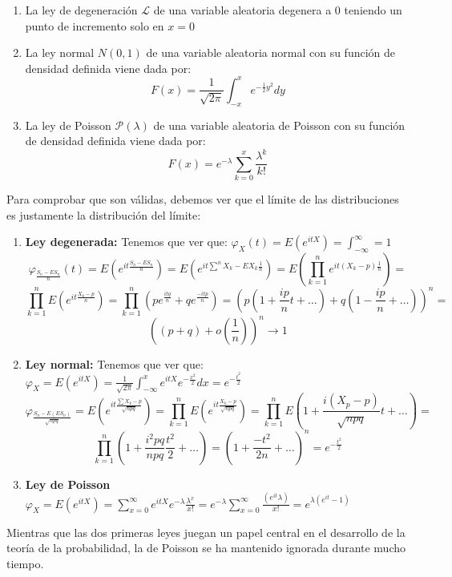 \begin{enumerate}
\item La ley de degeneración $\mathcal{L}$ de una variable aleatoria degenera a 0 teniendo un punto de incremento solo en $x=0$
\item La ley normal $N(0,1)$ de una variable aleatoria normal con su función de densidad definida viene dada por:
$$F(x)=\frac{1}{\sqrt{2\pi}}\int_{-x}^{x}e^{-\frac{1}{2}y^2}dy$$
\item La ley de Poisson $\mathcal{P}(\lambda)$ de una variable aleatoria de Poisson con su función de densidad definida viene dada por:
$$F(x)=e^{-\lambda}\sum_{k=0}^x \frac{\lambda^k}{k!}$$
\end{enumerate}
Para comprobar que son válidas, debemos ver que el límite de las distribuciones es justamente la distribución del límite:
\begin{enumerate}
\item \textbf{Ley degenerada: }Tenemos que ver que: $\varphi_{X}(t)=E(e^{itX})=\int_{-\infty}^{\infty}=1$
$$\varphi_{\frac{S_n -ES_n}{n}}(t)=E(e^{it\frac{S_n-ES_n}{n}})=E(e^{it\sum^n X_k-EX_k\frac{1}{n}})=E(\prod_{k=1}^{n}e^{it(X_k-p)\frac{1}{n}})=$$
$$\prod_{k=1}^{n}E(e^{it\frac{X_k-p}{n}})=\prod_{k=1}^{n}(pe^{\frac{itq}{n}}+qe^{\frac{-itp}{n}})=(p(1+\frac{ip}{n}t+\ldots)+q(1-\frac{ip}{n}+\ldots))^n=$$
$$((p+q)+o(\frac{1}{n}))^n\rightarrow 1$$
\item \textbf{Ley normal: }Tenemos que ver que: $\varphi_X=E(e^{itX})=\frac{1}{\sqrt{2 \pi}}\int_{-\infty}^{x}e^{itX}e^{-\frac{x^2}{2}}dx=e^{-\frac{t^2}{2}}$
$$\varphi_{\frac{S_n-E(ES_n)}{\sqrt{npq}}}=E(e^{it\frac{\sum X_k-p}{\sqrt{npq}}})=\prod_{k=1}^{n} E(e^{it\frac{X_k-p}{\sqrt{npq}}})=\prod_{k=1}^{n}E(1+\frac{i(X_p-p)}{\sqrt{npq}}t+\ldots)=$$
$$\prod_{k=1}^{n}(1+\frac{i^2pq}{npq}\frac{t^2}{2}+\ldots)=(1+\frac{-t^2}{2n}+\ldots)^n=e^{-\frac{t^2}{2}}$$
\item \textbf{Ley de Poisson} $\varphi_X=E(e^{itX})=\displaystyle\sum_{x=0}^{\infty}e^{itX}e^{-\lambda}\frac{\lambda^x}{x!}=e^{-\lambda}\displaystyle\sum_{x=0}^{\infty}\frac{(e^{it}\lambda)}{x!}=e^{\lambda(e^{it}-1)}$
\end{enumerate}
Mientras que las dos primeras leyes juegan un papel central en el desarrollo de la teoría de la probabilidad, la de Poisson se ha mantenido ignorada durante mucho tiempo.
